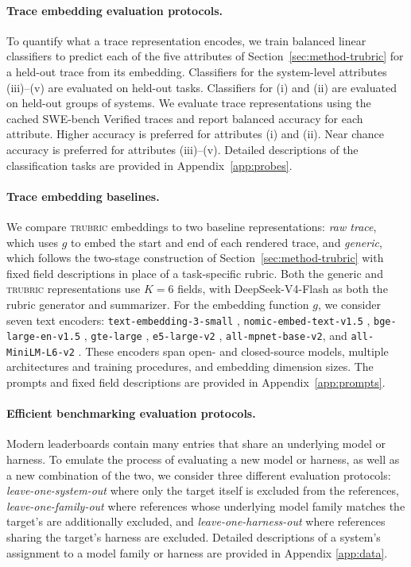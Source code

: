 \documentclass{article}
\newcommand{\trubric}{\textsc{trubric}}
\begin{document}
\paragraph{Trace embedding evaluation protocols.}
To quantify what a trace representation encodes, we train balanced linear classifiers to predict each of the five attributes of Section~\ref{sec:method-trubric} for a held-out trace from its embedding.
Classifiers for the system-level attributes (iii)--(v) are evaluated on held-out tasks.
Classifiers for (i) and (ii) are evaluated on held-out groups of systems.
We evaluate trace representations using the cached SWE-bench Verified traces and report balanced accuracy for each attribute.
Higher accuracy is preferred for attributes (i) and (ii).
Near chance accuracy is preferred for attributes (iii)--(v).
Detailed descriptions of the classification tasks are provided in Appendix~\ref{app:probes}.

\paragraph{Trace embedding baselines.}
We compare \trubric{} embeddings to two baseline representations: \emph{raw trace}, which uses $ g $ to embed the start and end of each rendered trace, and \emph{generic}, which follows the two-stage construction of Section~\ref{sec:method-trubric} with fixed field descriptions in place of a task-specific rubric.
Both the generic and \trubric{} representations use $K = 6$ fields, with DeepSeek-V4-Flash \citep{deepseek2026v4} as both the rubric generator and summarizer.
For the embedding function $g$, we consider seven text encoders: \texttt{text-embedding-3-small} \citep{neelakantan2022text}, \texttt{nomic-embed-text-v1.5} \citep{nussbaum2024nomic}, \texttt{bge-large-en-v1.5} \citep{xiao2023cpack}, \texttt{gte-large} \citep{li2023gte}, \texttt{e5-large-v2} \citep{wang2022e5}, \texttt{all-mpnet-base-v2}, and \texttt{all-MiniLM-L6-v2} \citep{reimers2019sbert}.
These encoders span open- and closed-source models, multiple architectures and training procedures, and embedding dimension sizes.
The prompts and fixed field descriptions are provided in Appendix~\ref{app:prompts}.

\paragraph{Efficient benchmarking evaluation protocols.}
Modern leaderboards contain many entries that share an underlying model or harness.
To emulate the process of evaluating a new model or harness, as well as a new combination of the two, we consider three different evaluation protocols: \emph{leave-one-system-out} where only the target itself is excluded from the references,
\emph{leave-one-family-out}  where references whose underlying model family matches the target's are additionally excluded, and \emph{leave-one-harness-out} where references sharing the target's harness are excluded.
Detailed descriptions of a system's assignment to a model family or harness are provided in Appendix \ref{app:data}.
\end{document}

